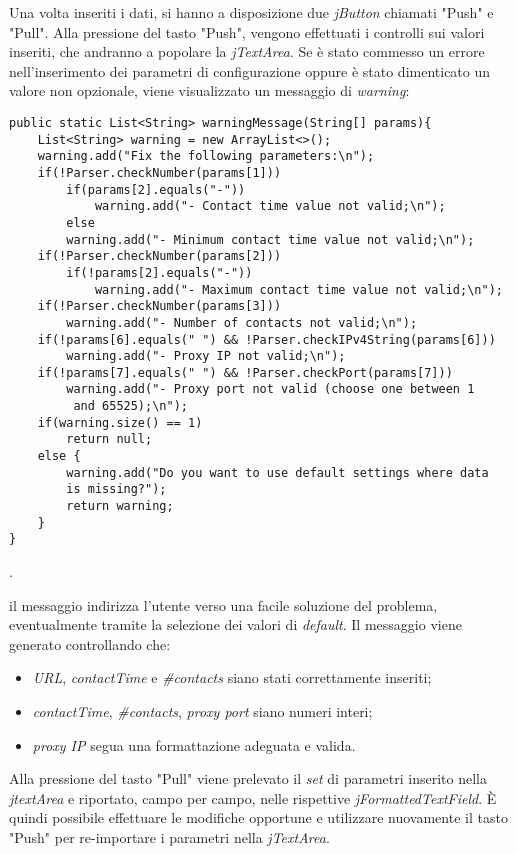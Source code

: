 Una volta inseriti i dati, si hanno a disposizione due \textit{jButton} chiamati "Push" e "Pull". 
Alla pressione del tasto "Push", vengono effettuati i controlli sui valori inseriti, che andranno a popolare la \textit{jTextArea}. Se \`{e} stato commesso un errore nell'inserimento dei parametri di configurazione oppure \`{e} stato dimenticato un valore non opzionale, viene visualizzato un messaggio di \textit{warning}:

\vspace{0.5cm}
\begin{lstlisting}
public static List<String> warningMessage(String[] params){
	List<String> warning = new ArrayList<>(); 
	warning.add("Fix the following parameters:\n");
	if(!Parser.checkNumber(params[1]))
		if(params[2].equals("-"))
			warning.add("- Contact time value not valid;\n");
		else
		warning.add("- Minimum contact time value not valid;\n");
	if(!Parser.checkNumber(params[2]))
		if(!params[2].equals("-"))
			warning.add("- Maximum contact time value not valid;\n");
	if(!Parser.checkNumber(params[3]))
		warning.add("- Number of contacts not valid;\n");
	if(!params[6].equals(" ") && !Parser.checkIPv4String(params[6]))
		warning.add("- Proxy IP not valid;\n");
	if(!params[7].equals(" ") && !Parser.checkPort(params[7]))
		warning.add("- Proxy port not valid (choose one between 1
		 and 65525);\n");
	if(warning.size() == 1)
		return null;
	else {
		warning.add("Do you want to use default settings where data 
		is missing?");
		return warning;
	}
}
\end{lstlisting}.

il messaggio indirizza l'utente verso una facile soluzione del problema, eventualmente tramite la selezione dei valori di \textit{default}.
Il messaggio viene generato controllando che:
\begin{itemize}
	\item \textit{URL}, \textit{contactTime} e \textit{\#contacts} siano stati correttamente inseriti;
	\item \textit{contactTime}, \textit{\#contacts}, \textit{proxy port} siano numeri interi;
	\item \textit{proxy IP} segua una formattazione adeguata e valida.
\end{itemize}

Alla pressione del tasto "Pull" viene prelevato il \textit{set} di parametri inserito nella \textit{jtextArea} e riportato, campo per campo, nelle rispettive \textit{jFormattedTextField}. 
\`{E} quindi possibile effettuare le modifiche opportune e utilizzare nuovamente il tasto "Push" per re-importare i parametri nella \textit{jTextArea}. 


